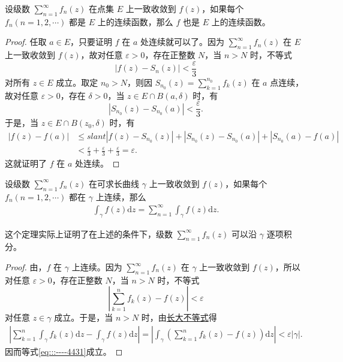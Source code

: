 \documentclass[../../main.tex]{subfiles}
\begin{document}
\begin{theorem}\label{theorem:定理4.1.4}
设级数 \( \sum_{n=1}^{\infty} f_n(z) \) 在点集 \( E \) 上一致收敛到 \( f(z) \)，如果每个 \( f_n (n = 1, 2, \cdots) \) 都是 \( E \) 上的连续函数，那么 \( f \) 也是 \( E \) 上的连续函数。
\end{theorem}
\begin{proof}
任取 \( a \in E \)，只要证明 \( f \) 在 \( a \) 处连续就可以了。因为 \( \sum_{n=1}^{\infty} f_n(z) \) 在 \( E \) 上一致收敛到 \( f(z) \)，故对任意 \( \varepsilon > 0 \)，存在正整数 \( N \)，当 \( n > N \) 时，不等式
\[
|f(z) - S_n(z)| < \frac{\varepsilon}{3}
\]
对所有 \( z \in E \) 成立。取定 \( n_0 > N \)，则因 \( S_{n_0}(z) = \sum_{k=1}^{n_0} f_k(z) \) 在 \( a \) 点连续，故对任意 \( \varepsilon > 0 \)，存在 \( \delta > 0 \)，当 \( z \in E \cap B(a, \delta) \) 时，有
\[
|S_{n_0}(z) - S_{n_0}(a)| < \frac{\varepsilon}{3}.
\]
于是，当 \( z \in E \cap B(z_0, \delta) \) 时，有
\begin{align*}
|f(z) - f(a)| &\leqslant slant |f(z) - S_{n_0}(z)| + |S_{n_0}(z) - S_{n_0}(a)| + |S_{n_0}(a) - f(a)| \\
&< \frac{\varepsilon}{3} + \frac{\varepsilon}{3} + \frac{\varepsilon}{3}= \varepsilon.
\end{align*}
这就证明了 \( f \) 在 \( a \) 处连续。
\end{proof}

\begin{theorem}\label{theorem:定理4.1.5}
设级数 \( \sum_{n=1}^{\infty} f_n(z) \) 在可求长曲线 \( \gamma \) 上一致收敛到 \( f(z) \)，如果每个 \( f_n (n = 1, 2, \cdots) \) 都在 \( \gamma \) 上连续，那么
\begin{align}
\int_{\gamma} f(z) \mathrm{d}z = \sum_{n=1}^{\infty} \int_{\gamma} f(z) \mathrm{d}z.\label{eq:::----4431}
\end{align}
\end{theorem}
\begin{remark}
这个定理实际上证明了在上述的条件下，级数 \( \sum_{n=1}^{\infty} f_n(z) \) 可以沿 \( \gamma \) 逐项积分。
\end{remark}
\begin{proof}
由，\( f \) 在 \( \gamma \) 上连续。因为 \( \sum_{n=1}^{\infty} f_n(z) \) 在 \( \gamma \) 上一致收敛到 \( f(z) \)，所以对任意 \( \varepsilon > 0 \)，存在正整数 \( N \)，当 \( n > N \) 时，不等式
\[
\left| \sum_{k=1}^{n} f_k(z) - f(z) \right| < \varepsilon
\]
对任意 \( z \in \gamma \) 成立。于是，当 \( n > N \) 时，由\hyperref[proposition:长大不等式]{长大不等式}得
\begin{align*}
\left| \sum_{k=1}^{n} \int_{\gamma} f_k(z) \mathrm{d}z - \int_{\gamma} f(z) \mathrm{d}z \right| = \left| \int_{\gamma} \left( \sum_{k=1}^{n} f_k(z) - f(z) \right) \mathrm{d}z \right| < \varepsilon |\gamma|.
\end{align*}
因而等式\eqref{eq:::----4431}成立。
\end{proof}
\end{document}
